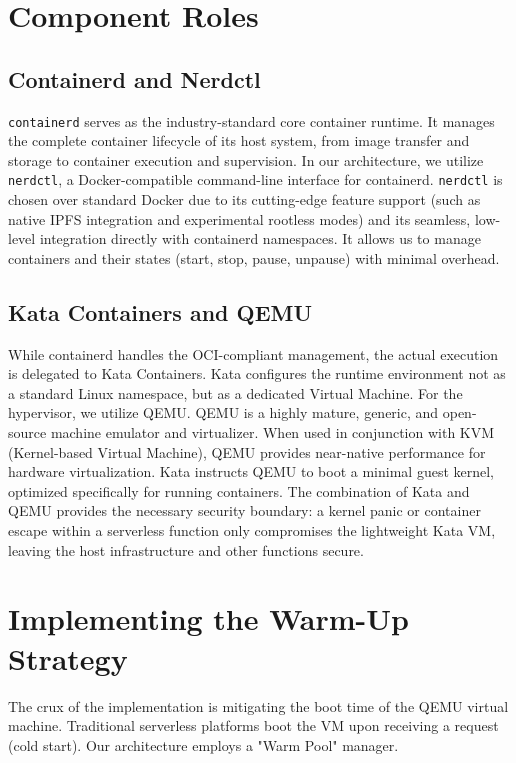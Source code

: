 \section{Component Roles}

\subsection{Containerd and Nerdctl}
\texttt{containerd} serves as the industry-standard core container runtime. It manages the complete container lifecycle of its host system, from image transfer and storage to container execution and supervision.
In our architecture, we utilize \texttt{nerdctl}, a Docker-compatible command-line interface for containerd. \texttt{nerdctl} is chosen over standard Docker due to its cutting-edge feature support (such as native IPFS integration and experimental rootless modes) and its seamless, low-level integration directly with containerd namespaces. It allows us to manage containers and their states (start, stop, pause, unpause) with minimal overhead.

\subsection{Kata Containers and QEMU}
While containerd handles the OCI-compliant management, the actual execution is delegated to Kata Containers. Kata configures the runtime environment not as a standard Linux namespace, but as a dedicated Virtual Machine.
For the hypervisor, we utilize QEMU. QEMU is a highly mature, generic, and open-source machine emulator and virtualizer. When used in conjunction with KVM (Kernel-based Virtual Machine), QEMU provides near-native performance for hardware virtualization. Kata instructs QEMU to boot a minimal guest kernel, optimized specifically for running containers.
The combination of Kata and QEMU provides the necessary security boundary: a kernel panic or container escape within a serverless function only compromises the lightweight Kata VM, leaving the host infrastructure and other functions secure.

\section{Implementing the Warm-Up Strategy}

The crux of the implementation is mitigating the boot time of the QEMU virtual machine. Traditional serverless platforms boot the VM upon receiving a request (cold start). Our architecture employs a "Warm Pool" manager.

